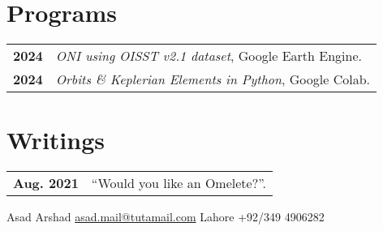 \documentclass[lighthipster]{simplehipstercv}
\newlength{\rightcolwidth}
\begin{document}
\begin{paracol}{2}
\begin{minipage}[t]{0.3\textwidth}
\end{minipage}\hfill
\begin{minipage}[t]{0.3\textwidth}
\section*{Programs}
\begin{tabular}{>{\footnotesize\bfseries}r >{\footnotesize}p{}}
    2024 & \emph{ONI using OISST v2.1 dataset}, Google Earth Engine. \\
    2024 & \emph{Orbits \& Keplerian Elements in Python}, Google Colab.
\end{tabular}
\bigskip

\section*{Writings}
\begin{tabular}{>{\footnotesize\bfseries}r >{\footnotesize}p{}}
    Aug. 2021 & ``Would you like an Omelete?''.
\end{tabular}
\end{minipage}






\vfill{} %

\setlength{\parindent}{0pt}
\begin{minipage}[t]{\rightcolwidth}
\begin{center}\fontfamily{\sfdefault}\selectfont \color{black!70}
{\small Asad Arshad  \protect\href{mailto:asad.mail!tutamail.com}{asad.mail@tutamail.com}  Lahore  +92/349 4906282 
}
\end{center}
\end{minipage}

\end{paracol}
\end{document}
